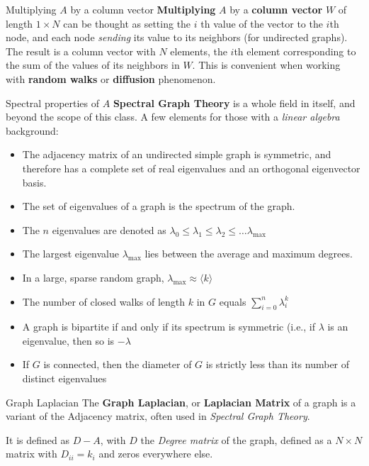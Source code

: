 \begin{textbox}{Multiplying $A$ by a column vector}
  \textbf{Multiplying} $A$ by a \textbf{column vector} $W$ of length $1\times N$ can be thought as setting the $i$ th value of the vector to the $i$th node, and each node \textit{sending} its value to its neighbors (for undirected graphs). The result is a column vector with $N$ elements, the $i$th element corresponding to the sum of the values of its neighbors in $W$. This is convenient when working with \textbf{random walks} or \textbf{diffusion} phenomenon.
\end{textbox}


\begin{textbox}{Spectral properties of $A$}
  \textbf{Spectral Graph Theory} is a whole field in itself, and beyond the scope of this class. A few elements for those with a \textit{linear algebra} background:

  \begin{itemize}
    \item The adjacency matrix of an undirected simple graph is symmetric, and therefore has a complete set of real eigenvalues and an orthogonal eigenvector basis.
    \item The set of eigenvalues of a graph is the spectrum of the graph.
    \item The $n$ eigenvalues are denoted as $\lambda_0 \leq \lambda_1 \leq \lambda_2 \leq \dots \lambda_{\max}$
    \item The largest eigenvalue $\lambda_{\max}$ lies between the average and maximum degrees.
    \item In a large, sparse random graph, $\lambda_{\max}\approx \langle k \rangle$
    \item The number of closed walks of length $k$ in $G$ equals $\sum^n_{i=0} \lambda^k_i$
    \item A graph is bipartite if and only if its spectrum is symmetric (i.e., if $\lambda$ is an eigenvalue, then so is $-\lambda$
    \item If $G$ is connected, then the diameter of $G$ is strictly less than its number of distinct eigenvalues
  \end{itemize}
\end{textbox}


\begin{textbox}{Graph Laplacian}
  The \textbf{Graph Laplacian}, or \textbf{Laplacian Matrix} of a graph is a variant of the Adjacency matrix, often used in \textit{Spectral Graph Theory}.

  It is defined as $D-A$, with $D$ the \textit{Degree matrix} of the graph, defined as a $N \times N$ matrix with $D_{ii}=k_i$ and zeros everywhere else.
\end{textbox}


